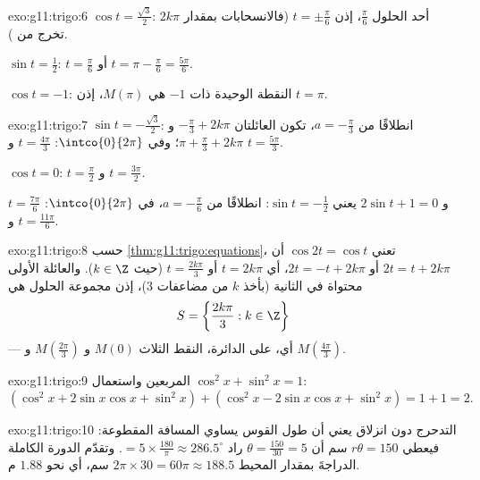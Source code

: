 \begin{solution}{exo:g11:trigo:6}
$\cos t = \frac{\sqrt3}{2}$: أحد الحلول $\frac\pi6$، إذن
$t = \pm\frac\pi6$ (فالانسحابات بمقدار $2k\pi$ تخرج من ).

$\sin t = \frac12$: $t = \frac\pi6$ أو $t = \pi - \frac\pi6 =
\frac{5\pi}{6}$.

$\cos t = -1$: النقطة الوحيدة ذات  $-1$ هي $M(\pi)$، إذن $t = \pi$.
\end{solution}

\begin{solution}{exo:g11:trigo:7}
$\sin t = -\frac{\sqrt3}{2}$: انطلاقًا من $a = -\frac\pi3$، تكون العائلتان
$-\frac\pi3 + 2k\pi$ و $\pi + \frac\pi3 + 2k\pi$؛ وفي
$\intco{0}{2\pi}$: $t = \frac{4\pi}{3}$ و $t = \frac{5\pi}{3}$.

$\cos t = 0$: $t = \frac\pi2$ و $t = \frac{3\pi}{2}$.

و $2\sin t + 1 = 0$ يعني $\sin t = -\frac12$: انطلاقًا من $a = -\frac\pi6$، في
$\intco{0}{2\pi}$: $t = \frac{7\pi}{6}$ و $t = \frac{11\pi}{6}$.
\end{solution}

\begin{solution}{exo:g11:trigo:8}
حسب \cref{thm:g11:trigo:equations}، تعني $\cos 2t = \cos t$ أن
$2t = t + 2k\pi$ أو $2t = -t + 2k\pi$، أي $t = 2k\pi$ أو
$t = \frac{2k\pi}{3}$ (حيث $k \in \Z$). والعائلة الأولى محتواة في
الثانية (بأخذ $k$ من مضاعفات $3$)، إذن مجموعة الحلول هي
\[
S = \left\{\frac{2k\pi}{3} : k \in \Z\right\}
\]
--- أي، على الدائرة، النقط الثلاث $M(0)$ و
$M\!\left(\frac{2\pi}{3}\right)$ و $M\!\left(\frac{4\pi}{3}\right)$.
\end{solution}

\begin{solution}{exo:g11:trigo:9}
 المربعين واستعمال $\cos^2 x + \sin^2 x = 1$:
\[
(\cos^2 x + 2\sin x\cos x + \sin^2 x)
+ (\cos^2 x - 2\sin x\cos x + \sin^2 x)
= 1 + 1 = 2 .
\]
\end{solution}

\begin{solution}{exo:g11:trigo:10}
التدحرج دون انزلاق يعني أن طول القوس يساوي المسافة
المقطوعة: فيعطي $r\theta = 150$ سم أن
$\theta = \frac{150}{30} = 5$ راد $= 5 \times \frac{180}{\pi} \approx
286.5^\circ$. وتقدّم الدورة الكاملة الدراجةَ بمقدار المحيط
$2\pi \times 30 = 60\pi \approx 188.5$ سم، أي نحو $1.88$ م.
\end{solution}

